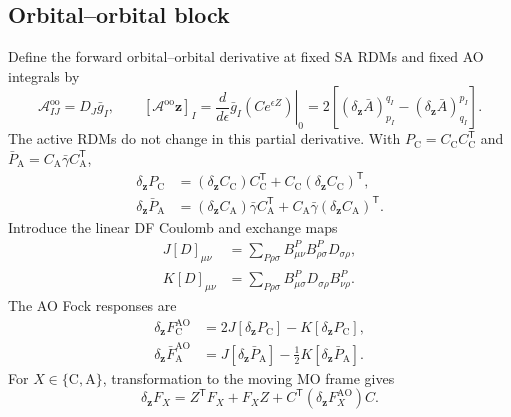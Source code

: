 \documentclass[aip,preprint,nofootinbib]{revtex4-1}
\newcommand{\core}{\mathrm{C}}
\newcommand{\act}{\mathrm{A}}
\begin{document}
\subsection{Orbital--orbital block}

Define the forward orbital--orbital derivative at fixed SA RDMs and fixed AO
integrals by
\begin{equation}
 \boxed{
 \mathcal A^{\mathrm{oo}}_{IJ}=D_J\bar g_I,
 \qquad
 [\mathcal A^{\mathrm{oo}}\mathbf z]_I
 =\left.\frac{d}{d\epsilon}\bar g_I(Ce^{\epsilon Z})\right|_0
 =2\left[(\delta_{\mathbf z}\bar A)^{q_I}_{p_I}
         -(\delta_{\mathbf z}\bar A)^{p_I}_{q_I}\right]
 }.
 \label{eq:nr-oo-action}
\end{equation}
The active RDMs do not change in this partial derivative.  With
$P_{\core}=C_{\core}C_{\core}^{\mathsf T}$ and
$\bar P_{\act}=C_{\act}\bar\gamma C_{\act}^{\mathsf T}$,
\begin{align}
 \delta_{\mathbf z}P_{\core}
 &=(\delta_{\mathbf z}C_{\core})C_{\core}^{\mathsf T}
  +C_{\core}(\delta_{\mathbf z}C_{\core})^{\mathsf T},
 \\
 \delta_{\mathbf z}\bar P_{\act}
 &=(\delta_{\mathbf z}C_{\act})\bar\gamma C_{\act}^{\mathsf T}
  +C_{\act}\bar\gamma(\delta_{\mathbf z}C_{\act})^{\mathsf T}.
 \label{eq:nr-density-response}
\end{align}
Introduce the linear DF Coulomb and exchange maps
\begin{align}
 J[D]_{\mu\nu}
 &=\sum_{P\rho\sigma}
 B^P_{\mu\nu}B^P_{\rho\sigma}D_{\sigma\rho},
 \\
 K[D]_{\mu\nu}
 &=\sum_{P\rho\sigma}
 B^P_{\mu\sigma}D_{\sigma\rho}B^P_{\nu\rho}.
\end{align}
The AO Fock responses are
\begin{align}
 \delta_{\mathbf z}F_{\core}^{\mathrm{AO}}
 &=2J[\delta_{\mathbf z}P_{\core}]-K[\delta_{\mathbf z}P_{\core}],
 \\
 \delta_{\mathbf z}\bar F_{\act}^{\mathrm{AO}}
 &=J[\delta_{\mathbf z}\bar P_{\act}]
  -\frac12K[\delta_{\mathbf z}\bar P_{\act}].
 \label{eq:nr-fock-response}
\end{align}
For $X\in\{\core,\act\}$, transformation to the moving MO frame gives
\begin{equation}
 \delta_{\mathbf z}F_X=Z^{\mathsf T}F_X+F_XZ
 +C^{\mathsf T}(\delta_{\mathbf z}F_X^{\mathrm{AO}})C.
 \label{eq:nr-mo-fock-response}
\end{equation}
\end{document}
